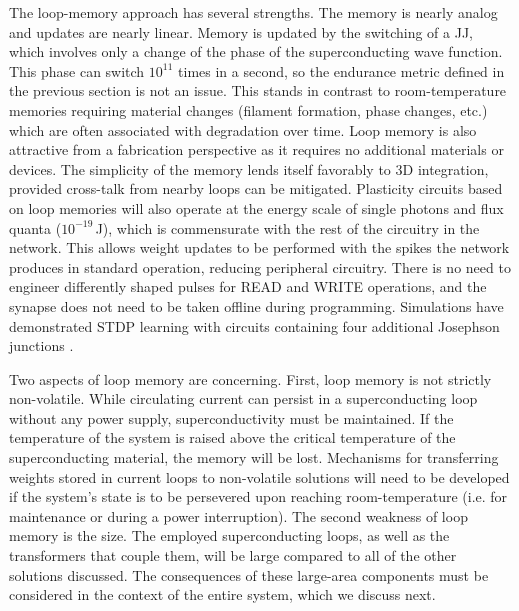 \documentclass[twocolumn]{article}
\begin{document}
The loop-memory approach has several strengths. The memory is nearly analog and updates are nearly linear. Memory is updated by the switching of a JJ, which involves only a change of the phase of the superconducting wave function. This phase can switch $10^{11}$ times in a second, so the endurance metric defined in the previous section is not an issue. This stands in contrast to room-temperature memories requiring material changes (filament formation, phase changes, etc.) which are often associated with degradation over time. Loop memory is also attractive from a fabrication perspective as it requires no additional materials or devices. The simplicity of the memory lends itself favorably to 3D integration, provided cross-talk from nearby loops can be mitigated. Plasticity circuits based on loop memories will also operate at the energy scale of single photons and flux quanta ($10^{-19}$\,J), which is commensurate with the rest of the circuitry in the network. This allows weight updates to be performed with the spikes the network produces in standard operation, reducing peripheral circuitry. There is no need to engineer differently shaped pulses for READ and WRITE operations, and the synapse does not need to be taken offline during programming. Simulations have demonstrated STDP learning with circuits containing four additional Josephson junctions \cite{shainline2019superconducting}. 

Two aspects of loop memory are concerning. First, loop memory is not strictly non-volatile. While circulating current can persist in a superconducting loop without any power supply, superconductivity must be maintained. If the temperature of the system is raised above the critical temperature of the superconducting material, the memory will be lost. Mechanisms for transferring weights stored in current loops to non-volatile solutions will need to be developed if the system's state is to be persevered upon reaching room-temperature (i.e. for maintenance or during a power interruption). The second weakness of loop memory is the size. The employed superconducting loops, as well as the transformers that couple them, will be large compared to all of the other solutions discussed. The consequences of these large-area components must be considered in the context of the entire system, which we discuss next.
\end{document}
